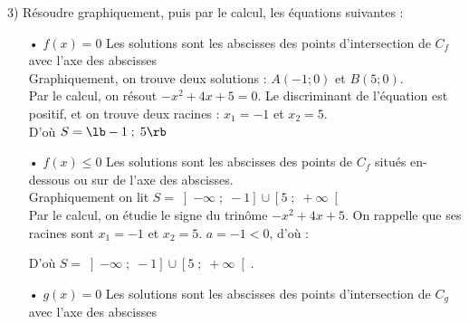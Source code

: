 \vspace*{.3cm}

3) Résoudre graphiquement, puis par le calcul, les équations suivantes : \\

\begin{itemize}
\item[•] $f\left(x\right) = 0$ Les solutions sont les abscisses des points d'intersection de $C_f$ avec l'axe des abscisses \\

Graphiquement, on trouve deux solutions : $A\left(-1 ; 0\right)$ et $B\left(5 ; 0\right)$. \\

Par le calcul, on résout $-x^2 + 4x + 5 = 0$. Le discriminant de l'équation est positif, et on trouve deux racines : $x_1 = -1$ et $x_2 = 5$. \\

D'où $S = \lb -1 \; ; \; 5 \rb$ \\

\newpage

\item[•] $f\left(x\right) \leqslant 0$ Les solutions sont les abscisses des points de $C_f$ situés en-dessous ou sur de l'axe des abscisses. \\

Graphiquement on lit $S = \left]-\infty \; ; \; -1 \right]\cup \left[5 \; ; \; +\infty\right[$ \\

Par le calcul, on étudie le signe du trinôme $-x^2 + 4x + 5$. On rappelle que ses racines sont $x_1 = -1$ et $x_2 = 5$. $a = -1 < 0$, d'où : \\


\vspace*{.3cm}

D'où $S = \left]-\infty \; ; \; -1 \right]\cup \left[5 \; ; \; +\infty\right[$. \\

\item[•] $g\left(x\right) = 0$ Les solutions sont les abscisses des points d'intersection de $C_g$ avec l'axe des abscisses \\


\end{itemize}
